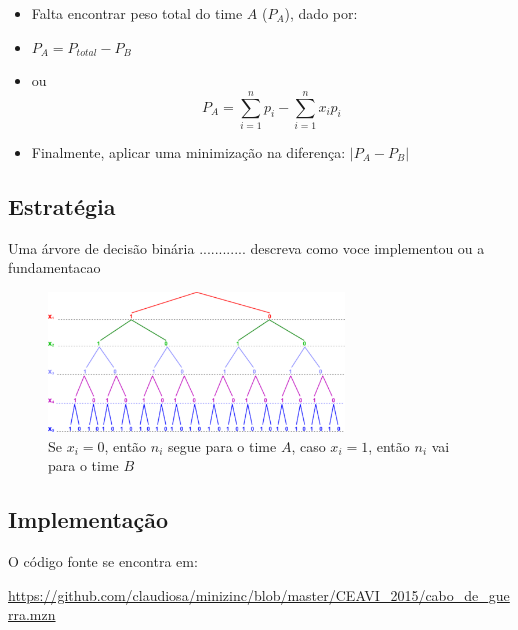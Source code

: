 
  \begin{itemize}
  \item Falta encontrar peso total do time $A$ ($P_A$), dado por: 

  \item $P_A = P_{total} - P_B$
  
  \item  ou $$P_A = \sum_{i=1}^n p_i - \sum_{i=1}^n x_i p_i$$   

  \item Finalmente, aplicar uma minimização  na diferença: $|P_A - P_B|$
  
  
  \end{itemize}

\subsection{Estratégia}%

Uma árvore de decisão binária ............ descreva como
voce implementou ou a fundamentacao

\begin{figure}[ht!]
 \centering
 \includegraphics[width=0.7\textwidth , height=0.3\textheight]{../figuras/binary_tree04.pdf}
\caption{Se $x_i=0$, então $n_i$ segue para o time $A$, caso  $x_i=1$, então  $n_i$ vai para o time $B$} 
\end{figure}

\subsection{Implementação}

O código fonte se encontra em:

\url{https://github.com/claudiosa/minizinc/blob/master/CEAVI_2015/cabo_de_guerra.mzn}

